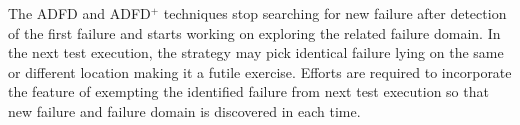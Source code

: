 

The ADFD and ADFD$^+$ techniques stop searching for new failure after detection of the first failure and starts working on exploring the related failure domain. In the next test execution, the strategy may pick identical failure lying on the same or different location making it a futile exercise. Efforts are required to incorporate the feature of exempting the identified failure from next test execution so that new failure and failure domain is discovered in each time.\\





